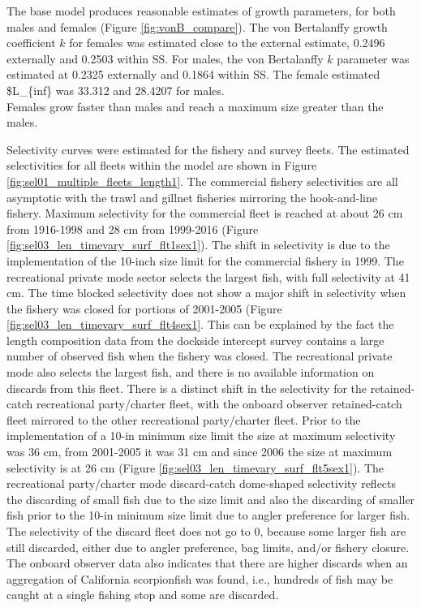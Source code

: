 \documentclass[12pt,]{article}
\begin{document}
The base model produces reasonable estimates of growth parameters, for
both males and females (Figure \ref{fig:vonB_compare}). The von
Bertalanffy growth coefficient \(k\) for females was estimated close to
the external estimate, 0.2496 externally and 0.2503 within SS. For
males, the von Bertalanffy \(k\) parameter was estimated at 0.2325
externally and 0.1864 within SS. The female estimated \$L\_\{inf\} was
33.312 and 28.4207 for males.\\
Females grow faster than males and reach a maximum size greater than the
males.

Selectivity curves were estimated for the fishery and survey fleets. The
estimated selectivities for all fleets within the model are shown in
Figure \ref{fig:sel01_multiple_fleets_length1}. The commercial fishery
selectivities are all asymptotic with the trawl and gillnet fisheries
mirroring the hook-and-line fishery. Maximum selectivity for the
commercial fleet is reached at about 26 cm from 1916-1998 and 28 cm from
1999-2016 (Figure \ref{fig:sel03_len_timevary_surf_flt1sex1}). The shift
in selectivity is due to the implementation of the 10-inch size limit
for the commercial fishery in 1999. The recreational private mode sector
selects the largest fish, with full selectivity at 41 cm. The time
blocked selectivity does not show a major shift in selectivity when the
fishery was closed for portions of 2001-2005 (Figure
\ref{fig:sel03_len_timevary_surf_flt4sex1}. This can be explained by the
fact the length composition data from the dockside intercept survey
contains a large number of observed fish when the fishery was closed.
The recreational private mode also selects the largest fish, and there
is no available information on discards from this fleet. There is a
distinct shift in the selectivity for the retained-catch recreational
party/charter fleet, with the onboard observer retained-catch fleet
mirrored to the other recreational party/charter fleet. Prior to the
implementation of a 10-in minimum size limit the size at maximum
selectivity was 36 cm, from 2001-2005 it was 31 cm and since 2006 the
size at maximum selectivity is at 26 cm (Figure
\ref{fig:sel03_len_timevary_surf_flt5sex1}). The recreational
party/charter mode discard-catch dome-shaped selectivity reflects the
discarding of small fish due to the size limit and also the discarding
of smaller fish prior to the 10-in minimum size limit due to angler
preference for larger fish. The selectivity of the discard fleet does
not go to 0, because some larger fish are still discarded, either due to
angler preference, bag limits, and/or fishery closure. The onboard
observer data also indicates that there are higher discards when an
aggregation of California scorpionfish was found, i.e., hundreds of fish
may be caught at a single fishing stop and some are discarded.
\end{document}
